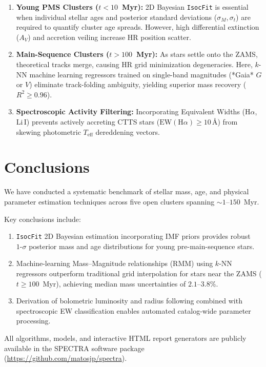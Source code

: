 \documentclass[fleqn,usenatbib]{mnras}
\begin{document}
\begin{enumerate}
    \item \textbf{Young PMS Clusters ($t < 10$~Myr):} 2D Bayesian \texttt{IsocFit} is essential when individual stellar ages and posterior standard deviations ($\sigma_M, \sigma_t$) are required to quantify cluster age spreads. However, high differential extinction ($A_V$) and accretion veiling increase HR position scatter.
    \item \textbf{Main-Sequence Clusters ($t > 100$~Myr):} As stars settle onto the ZAMS, theoretical tracks merge, causing HR grid minimization degeneracies. Here, $k$-NN machine learning regressors trained on single-band magnitudes (*Gaia* $G$ or $V$) eliminate track-folding ambiguity, yielding superior mass recovery ($R^2 \ge 0.96$).
    \item \textbf{Spectroscopic Activity Filtering:} Incorporating Equivalent Widths ($\text{H}\alpha$, $\text{Li}\,\text{I}$) prevents actively accreting CTTS stars ($\text{EW}(\text{H}\alpha) \ge 10\,\text{\AA}$) from skewing photometric $T_{\text{eff}}$ dereddening vectors.
\end{enumerate}


\section{Conclusions}
\label{sec:conclusions}

We have conducted a systematic benchmark of stellar mass, age, and physical parameter estimation techniques across five open clusters spanning $\sim 1\text{--}150$~Myr.

Key conclusions include:
\begin{enumerate}
    \item \texttt{IsocFit} 2D Bayesian estimation incorporating IMF priors provides robust $1\text{-}\sigma$ posterior mass and age distributions for young pre-main-sequence stars.
    \item Machine-learning Mass--Magnitude relationships (RMM) using $k$-NN regressors outperform traditional grid interpolation for stars near the ZAMS ($t \ge 100$~Myr), achieving median mass uncertainties of $2.1\text{--}3.8\%$.
    \item Derivation of bolometric luminosity and radius following \citet{bell2014pre} combined with spectroscopic EW classification enables automated catalog-wide parameter processing.
\end{enumerate}

All algorithms, models, and interactive HTML report generators are publicly available in the \textsc{SPECTRA} software package (\url{https://github.com/matosjp/spectra}).
\end{document}

